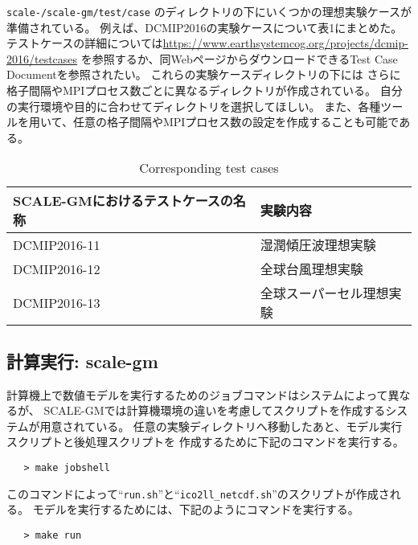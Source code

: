 \noindent \texttt{scale-{\version}/scale-gm/test/case} のディレクトリの下にいくつかの理想実験ケースが準備されている。
例えば、DCMIP2016の実験ケースについて表1にまとめた。
テストケースの詳細については\url{https://www.earthsystemcog.org/projects/dcmip-2016/testcases}
を参照するか、同WebページからダウンロードできるTest Case Documentを参照されたい。
これらの実験ケースディレクトリの下には
さらに格子間隔やMPIプロセス数ごとに異なるディレクトリが作成されている。
自分の実行環境や目的に合わせてディレクトリを選択してほしい。
また、各種ツールを用いて、任意の格子間隔やMPIプロセス数の設定を作成することも可能である。

 \begin{table}[b]
 \begin{center}
 \caption{Corresponding test cases}
 \begin{tabularx}{150mm}{|l|X|} \hline
 \rowcolor[gray]{0.9} SCALE-GMにおけるテストケースの名称 & 実験内容 \\ \hline
  DCMIP2016-11 & 湿潤傾圧波理想実験  \\ \hline
  DCMIP2016-12 & 全球台風理想実験 \\ \hline
  DCMIP2016-13 & 全球スーパーセル理想実験 \\ \hline
 \end{tabularx}
 \end{center}
 \end{table}


\subsection{計算実行: scale-gm}

計算機上で数値モデルを実行するためのジョブコマンドはシステムによって異なるが、
SCALE-GMでは計算機環境の違いを考慮してスクリプトを作成するシステムが用意されている。
任意の実験ディレクトリへ移動したあと、モデル実行スクリプトと後処理スクリプトを
作成するために下記のコマンドを実行する。

 \begin{verbatim}
   > make jobshell
 \end{verbatim}

このコマンドによって``\verb|run.sh|''と``\verb|ico2ll_netcdf.sh|''のスクリプトが作成される。
モデルを実行するためには、下記のようにコマンドを実行する。

 \begin{verbatim}
   > make run
 \end{verbatim}

